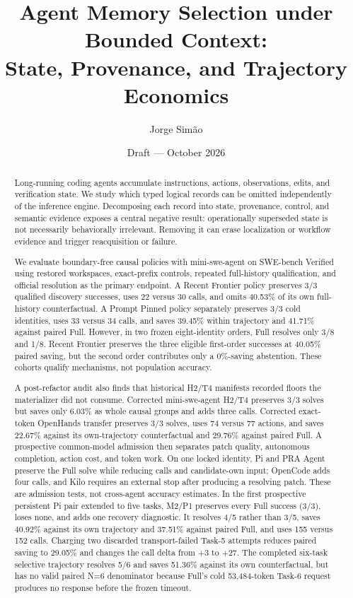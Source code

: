 \documentclass[11pt]{article}
\title{Agent Memory Selection under Bounded Context:\\
\large State, Provenance, and Trajectory Economics}
\author{Jorge Sim\~ao}
\date{Draft --- October 2026}
\begin{document}
\maketitle

\begin{abstract}
Long-running coding agents accumulate instructions, actions, observations,
edits, and verification state.  We study which typed logical records can be
omitted independently of the inference engine.  Decomposing each record into
state, provenance, control, and semantic evidence exposes a central negative
result: operationally superseded state is not necessarily behaviorally
irrelevant.  Removing it can erase localization or workflow evidence and
trigger reacquisition or failure.

We evaluate boundary-free causal policies with mini-swe-agent on SWE-bench
Verified using restored workspaces, exact-prefix controls, repeated
full-history qualification, and official resolution as the primary endpoint.
A Recent Frontier policy preserves 3/3 qualified discovery successes, uses 22
versus 30 calls, and omits 40.53\% of its own full-history counterfactual.  A
Prompt Pinned policy separately preserves 3/3 cold identities, uses 33 versus
34 calls, and saves 39.45\% within trajectory and 41.71\% against paired Full.
However, in two frozen eight-identity orders, Full resolves only 3/8 and 1/8.
Recent Frontier preserves the three eligible first-order successes at 40.05\%
paired saving, but the second order contributes only a 0\%-saving abstention.
These cohorts qualify mechanisms, not population accuracy.

A post-refactor audit also finds that historical H2/T4 manifests recorded
floors the materializer did not consume.  Corrected mini-swe-agent H2/T4
preserves 3/3 solves but saves only 6.03\% as whole causal groups and adds three
calls.  Corrected exact-token OpenHands transfer preserves 3/3 solves, uses 74
versus 77 actions, and saves 22.67\% against its own-trajectory counterfactual
and 29.76\% against paired Full.  A prospective common-model admission then
separates patch quality, autonomous completion, action cost, and token work.
On one locked identity, Pi and PRA Agent preserve the Full solve while reducing
calls and candidate-own input; OpenCode adds four calls, and Kilo requires an
external stop after producing a resolving patch.  These are admission tests,
not cross-agent accuracy estimates.  In the first prospective persistent Pi
pair extended to five tasks, M2/P1 preserves every Full success (3/3), loses
none, and adds one recovery diagnostic.  It resolves 4/5 rather than 3/5,
saves 40.92\% against its own trajectory and 37.51\% against paired Full, and
uses 155 versus 152 calls.  Charging two discarded transport-failed Task-5
attempts reduces paired saving to 29.05\% and changes the call delta from
$+3$ to $+27$.  The completed six-task selective trajectory resolves 5/6 and
saves 51.36\% against its own counterfactual, but has no valid paired N=6
denominator because Full's cold 53,484-token Task-6 request produces no
response before the frozen timeout.


\end{abstract}
\end{document}
